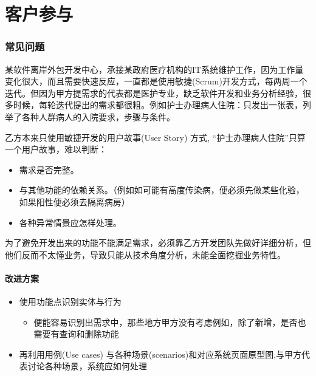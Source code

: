 \chapter{客户参与} %

\hypertarget{ux5e38ux89c1ux95eeux9898}{%
\subsection{常见问题}\label{ux5e38ux89c1ux95eeux9898}}

某软件离岸外包开发中心，承接某政府医疗机构的IT系统维护工作，因为工作量变化很大，而且需要快速反应，一直都是使用敏捷(Scrum)开发方式，每两周一个迭代。但因为甲方提需求的代表都是医护专业，缺乏软件开发和业务分析经验，很多时候，每轮迭代提出的需求都很粗。例如护士办理病人住院：只发出一张表，列举了各种人群病人的入院要求，步骤与条件。

乙方本来只使用敏捷开发的用户故事(User Story) 方式,
``护士办理病人住院''只算一个用户故事，难以判断：

\begin{itemize}
\tightlist
\item
  需求是否完整。
\item
  与其他功能的依赖关系。（例如如可能有高度传染病，便必须先做某些化验，如果阳性便必须去隔离病房）
\item
  各种异常情景应怎样处理。
\end{itemize}

为了避免开发出来的功能不能满足需求，必须靠乙方开发团队先做好详细分析，但他们反而不太懂业务，导致只能从技术角度分析，未能全面挖掘业务特性。

\hypertarget{ux6539ux8fdbux65b9ux6848}{%
\subsubsection{改进方案}\label{ux6539ux8fdbux65b9ux6848}}

\begin{itemize}
\tightlist
\item
  使用功能点识别实体与行为

  \begin{itemize}
  \tightlist
  \item
    便能容易识别出需求中，那些地方甲方没有考虑例如，除了新增，是否也需要有查询和删除功能
  \end{itemize}
\item
  再利用用例(Use cases)
  与各种场景(scenarios)和对应系统页面原型图,与甲方代表讨论各种场景，系统应如何处理
\end{itemize}

